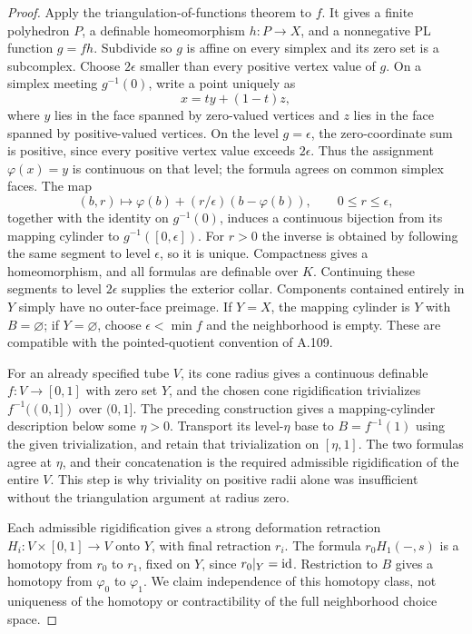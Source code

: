 \begin{proof}
Apply the triangulation-of-functions theorem
\cite[Theorem 2.2(1)]{Shiota2010} to $f$. It gives a finite polyhedron
$P$, a definable homeomorphism $h:P\to X$, and a nonnegative PL
function $g=fh$. Subdivide so $g$ is affine on every simplex and its
zero set is a subcomplex. Choose $2\epsilon$ smaller than every
positive vertex value of $g$. On a simplex meeting $g^{-1}(0)$,
write a point uniquely as
\[
 x=t y+(1-t)z,
\]
where $y$ lies in the face spanned by zero-valued vertices and $z$
lies in the face spanned by positive-valued vertices. On the level
$g=\epsilon$, the zero-coordinate sum is positive, since every
positive vertex value exceeds $2\epsilon$. Thus the assignment
$\varphi(x)=y$ is continuous on that level; the formula agrees on
common simplex faces. The map
\[
 (b,r)\longmapsto\varphi(b)+(r/\epsilon)(b-\varphi(b)),
 \qquad 0\le r\le\epsilon,
\]
together with the identity on $g^{-1}(0)$, induces a continuous
bijection from its mapping cylinder to $g^{-1}([0,\epsilon])$.
For $r>0$ the inverse is obtained by following the same segment to
level $\epsilon$, so it is unique. Compactness gives a homeomorphism,
and all formulas are definable over $K$. Continuing these segments to
level $2\epsilon$ supplies the exterior collar. Components contained
entirely in $Y$ simply have no outer-face preimage. If $Y=X$, the
mapping cylinder is $Y$ with $B=\varnothing$; if $Y=\varnothing$,
choose $\epsilon<\min f$ and the neighborhood is empty. These are
compatible with the pointed-quotient convention of A.109.

For an already specified tube $V$, its cone radius gives a continuous
definable $f:V\to[0,1]$ with zero set $Y$, and the chosen cone
rigidification trivializes $f^{-1}((0,1])$ over $(0,1]$. The preceding
construction gives a mapping-cylinder description below some
$\eta>0$. Transport its level-$\eta$ base to $B=f^{-1}(1)$ using the
given trivialization, and retain that trivialization on $[\eta,1]$.
The two formulas agree at $\eta$, and their concatenation is the
required admissible rigidification of the entire $V$. This step is
why triviality on positive radii alone was insufficient without the
triangulation argument at radius zero.

Each admissible rigidification gives a strong deformation retraction
$H_i:V\times[0,1]\to V$ onto $Y$, with final retraction $r_i$.
The formula $r_0H_1(-,s)$ is a homotopy from $r_0$ to $r_1$, fixed
on $Y$, since $r_0|_Y=\operatorname{id}$. Restriction to $B$ gives a homotopy
from $\varphi_0$ to $\varphi_1$. We claim independence of this
homotopy class, not uniqueness of the homotopy or contractibility of
the full neighborhood choice space.
\end{proof}

